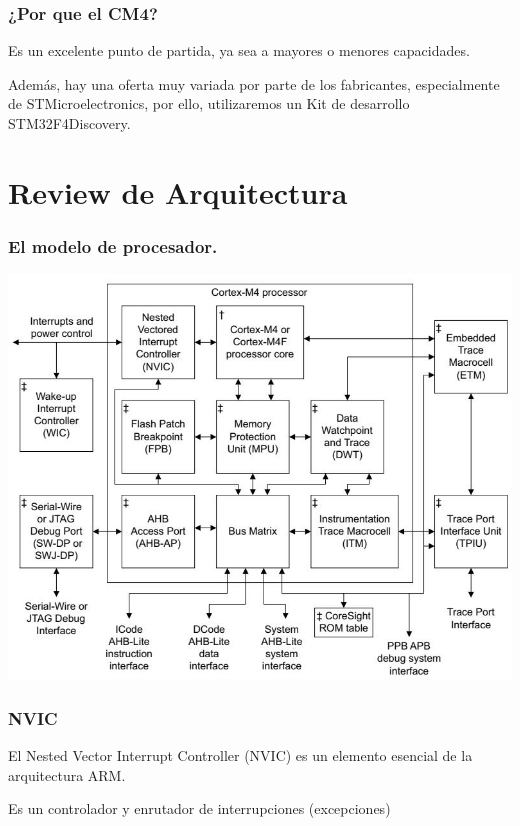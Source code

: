 \documentclass[11pt]{beamer}
\begin{document}
        \begin{frame}
            \frametitle{¿Por que el CM4?}

            Es un excelente punto de partida, ya sea a mayores o menores capacidades. 
            
            Además, hay una oferta muy variada por parte de los fabricantes, especialmente de STMicroelectronics, por ello, utilizaremos un Kit de desarrollo STM32F4Discovery. 

        \end{frame}

    \section{Review de Arquitectura}

        \begin{frame}
            \frametitle{El modelo de procesador.}

            \begin{center}
                \includegraphics[scale = 0.4]{./Resources/CM4_MODEL.jpg}
            \end{center}
        \end{frame}

        \begin{frame}
            \frametitle{NVIC}

            El Nested Vector Interrupt Controller (NVIC) es un elemento esencial de la arquitectura ARM.
            
            Es un controlador y enrutador de interrupciones (excepciones)

        \end{frame}
\end{document}
